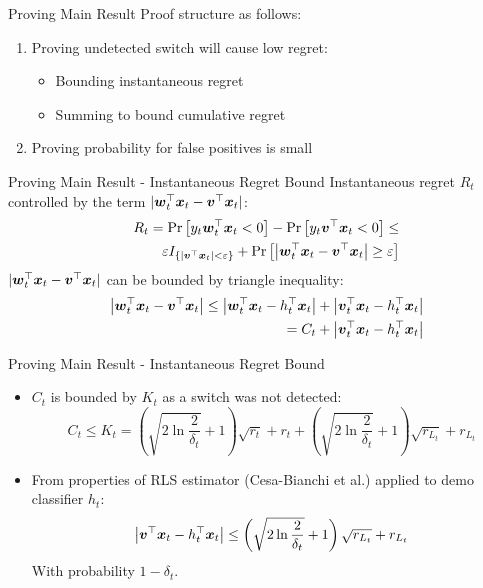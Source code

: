 \documentclass{beamer}
\begin{document}
\begin{frame}{Proving Main Result}
Proof structure as follows:\newline
\begin{enumerate}
\item Proving undetected switch will cause low regret:\newline
\begin{itemize}
\item Bounding instantaneous regret \newline
\item Summing to bound cumulative regret \newline
\end{itemize}
\item Proving probability for false positives is small
\end{enumerate}
\end{frame}

\begin{frame}{Proving Main Result - Instantaneous Regret Bound}
Instantaneous regret $R_t$ controlled by the term $|{{\boldsymbol{w}}}^{\top}_{t}{\boldsymbol{x}}_{t}-{{\boldsymbol{v}}}^{\top}{\boldsymbol{x}}_{t}|$:
\begin{eqnarray*}
&&R_t={\rm Pr}\left[{y_t{{\boldsymbol{w}}}^{\top}_{t}{\boldsymbol{x}}_{t}<0}\right]-{\rm Pr}\left[{y_t{{\boldsymbol{v}}}^{\top}{\boldsymbol{x}}_{t}<0}\right]\leq\nonumber\\
&&\varepsilon I_{\{\left|{{\boldsymbol{v}}}^{\top}{\boldsymbol{x}}_{t}\right|<\varepsilon\}}+{\rm Pr}\left[{\left|{{\boldsymbol{w}}}^{\top}_{t}{\boldsymbol{x}}_{t}-{{\boldsymbol{v}}}^{\top}{\boldsymbol{x}}_{t}\right|\geq\varepsilon}\right]
\label{regret_wt_ht1}
\end{eqnarray*}
$|{{\boldsymbol{w}}}^{\top}_{t}{\boldsymbol{x}}_{t}-{{\boldsymbol{v}}}^{\top}{\boldsymbol{x}}_{t}|$ can be bounded by triangle inequality:
\begin{eqnarray*}
&&\left\vert{{\boldsymbol{w}}}^{\top}_{t}{\boldsymbol{x}}_{t}-{{\boldsymbol{v}}}^{\top}{\boldsymbol{x}}_{t}\right\vert\leq\left\vert{{\boldsymbol{w}}}^{\top}_{t}{\boldsymbol{x}}_{t}-h_{t}^{\top}{\boldsymbol{x}}_{t}\right\vert+\left\vert{{\boldsymbol{v}}}^{\top}_{t}{\boldsymbol{x}}_{t}-h_{t}^{\top}{\boldsymbol{x}}_{t}\right\vert\nonumber\\
&&=C_t+\left\vert{{\boldsymbol{v}}}^{\top}_{t}{\boldsymbol{x}}_{t}-h_{t}^{\top}{\boldsymbol{x}}_{t}\right\vert
\label{triangl_ht_wt}
\end{eqnarray*}
\end{frame}

\begin{frame}{Proving Main Result - Instantaneous Regret Bound}
\begin{itemize}
\item $C_t$ is bounded by $K_t$ as a switch was not detected:
\begin{equation}
C_t\leq K_t=\left(\sqrt{2\ln{\frac{2}{\delta_t}}}+1\right)\sqrt{r_t}+r_t+\left(\sqrt{2\ln{\frac{2}{\delta_t}}}+1\right)\sqrt{r_{L_t}}+r_{L_t} 
\end{equation}
\item From properties of RLS estimator (Cesa-Bianchi et al.) applied to demo classifier $h_t$:
\begin{equation}
\left\vert{{\boldsymbol{v}}}^{\top}{\boldsymbol{x}}_{t}-h_{t}^{\top}{\boldsymbol{x}}_{t}\right\vert\leq\left(\sqrt{2\ln{\frac{2}{\delta_t}}}+1\right)\sqrt{r_{L_t}}+r_{L_t}
\label{rLt_false}
\end{equation}
With probability $1-\delta_t$.
\end{itemize}
\end{frame}
\end{document}
